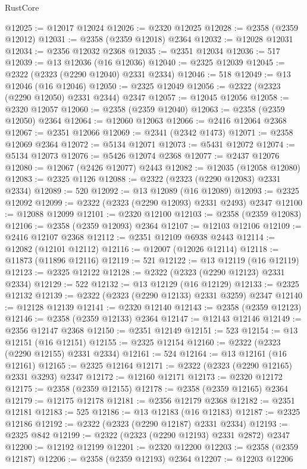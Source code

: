 \begin{lexlean}{RustCore}
\begin{coremodule}
@12025 := @12017 @12024
@12026 := @2320 @12025
@12028 := @2358 (@2359 @12012)
@12031 := @2358 (@2359 @12018) @2364
@12032 := @12028 @12031
@12034 := @2356 @12032 @2368
@12035 := @2351 @12034
@12036 := 517
@12039 := @13 @12036 (@16 @12036)
@12040 := @2325 @12039
@12045 := @2322 (@2323 (@2290 @12040) @2331 @2334)
@12046 := 518
@12049 := @13 @12046 (@16 @12046)
@12050 := @2325 @12049
@12056 := @2322 (@2323 (@2290 @12050) @2331 @2344) @2347
@12057 := @12045 @12056
@12058 := @2320 @12057
@12060 := @2358 (@2359 @12040)
@12063 := @2358 (@2359 @12050) @2364
@12064 := @12060 @12063
@12066 := @2416 @12064 @2368
@12067 := @2351 @12066
@12069 := @2341 (@2342 @1473)
@12071 := @2358 @12069 @2364
@12072 := @5134 @12071
@12073 := @5431 @12072
@12074 := @5134 @12073
@12076 := @5426 @12074 @2368
@12077 := @2437 @12076
@12080 := @12067 (@2426 @12077) @2443
@12082 := @12035 (@12058 @12080)
@12083 := @2325 @1126
@12088 := @2322 (@2323 (@2290 @12083) @2331 @2334)
@12089 := 520
@12092 := @13 @12089 (@16 @12089)
@12093 := @2325 @12092
@12099 := @2322 (@2323 (@2290 @12093) @2331 @2493) @2347
@12100 := @12088 @12099
@12101 := @2320 @12100
@12103 := @2358 (@2359 @12083)
@12106 := @2358 (@2359 @12093) @2364
@12107 := @12103 @12106
@12109 := @2416 @12107 @2368
@12112 := @2351 @12109 @6938 @2443
@12114 := @12082 (@12101 @12112)
@12116 := @12007 (@12026 @12114)
@12118 := @11873 (@11896 @12116)
@12119 := 521
@12122 := @13 @12119 (@16 @12119)
@12123 := @2325 @12122
@12128 := @2322 (@2323 (@2290 @12123) @2331 @2334)
@12129 := 522
@12132 := @13 @12129 (@16 @12129)
@12133 := @2325 @12132
@12139 := @2322 (@2323 (@2290 @12133) @2331 @3259) @2347
@12140 := @12128 @12139
@12141 := @2320 @12140
@12143 := @2358 (@2359 @12123)
@12146 := @2358 (@2359 @12133) @2364
@12147 := @12143 @12146
@12149 := @2356 @12147 @2368
@12150 := @2351 @12149
@12151 := 523
@12154 := @13 @12151 (@16 @12151)
@12155 := @2325 @12154
@12160 := @2322 (@2323 (@2290 @12155) @2331 @2334)
@12161 := 524
@12164 := @13 @12161 (@16 @12161)
@12165 := @2325 @12164
@12171 := @2322 (@2323 (@2290 @12165) @2331 @3293) @2347
@12172 := @12160 @12171
@12173 := @2320 @12172
@12175 := @2358 (@2359 @12155)
@12178 := @2358 (@2359 @12165) @2364
@12179 := @12175 @12178
@12181 := @2356 @12179 @2368
@12182 := @2351 @12181
@12183 := 525
@12186 := @13 @12183 (@16 @12183)
@12187 := @2325 @12186
@12192 := @2322 (@2323 (@2290 @12187) @2331 @2334)
@12193 := @2325 @842
@12199 := @2322 (@2323 (@2290 @12193) @2331 @2872) @2347
@12200 := @12192 @12199
@12201 := @2320 @12200
@12203 := @2358 (@2359 @12187)
@12206 := @2358 (@2359 @12193) @2364
@12207 := @12203 @12206

\end{coremodule}
\end{lexlean}
